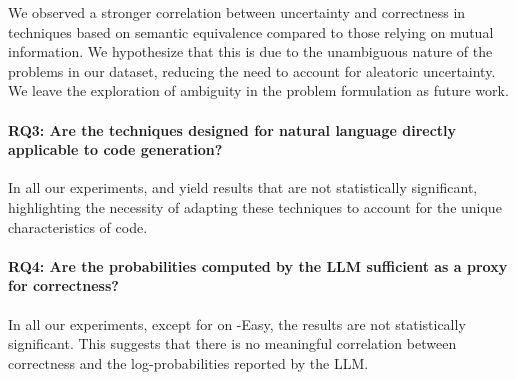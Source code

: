 We observed a stronger correlation between uncertainty and correctness in techniques based on semantic equivalence compared to those relying on mutual information. We hypothesize that this is due to the unambiguous nature of the problems in our dataset, reducing the need to account for aleatoric uncertainty. We leave the exploration of ambiguity in the problem formulation as future work.

\paragraph{RQ3: Are the techniques designed for natural language directly applicable to code generation?}
In all our experiments, \SEOriginal and \MIOriginal yield results that are not statistically significant, highlighting the necessity of adapting these techniques to account for the unique characteristics of code.




\paragraph{RQ4: Are the probabilities computed by the LLM sufficient as a proxy for correctness?}
In all our experiments, except for \gptturbo on \livecodebench-Easy, the results are not statistically significant. This suggests that there is no meaningful correlation between correctness and the log-probabilities reported by the LLM.

